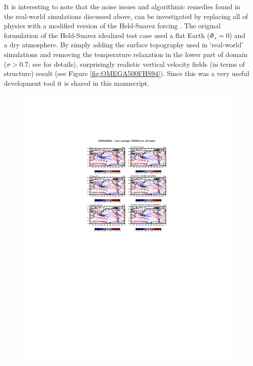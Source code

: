 \documentclass[draft]{agujournal2019}
\begin{document}
It is interesting to note that the noise issues and algorithmic remedies found in the real-world simulations discussed above, can be investigated by replacing all of physics with a modified version of the Held-Suarez forcing \cite{HS1994}. The original formulation of the Held-Suarez idealized test case used a flat Earth ($\Phi_s=0$) and a dry atmosphere. By simply adding the surface topography used in `real-world' simulations and removing the temperature relaxation in the lower part of domain ($\sigma>0.7$; see  for details), surprisingly realistic vertical velocity fields (in terms of structure) result (see Figure \ref{fig:OMEGA500FHS94}). Since this was a very useful development tool it is shared in this manuscript. 

\begin{figure}[t]
\begin{center}
\includegraphics[width=145mm]{OMEGA500F2000climo.pdf}
\end{center}

\end{figure}
\end{document}
